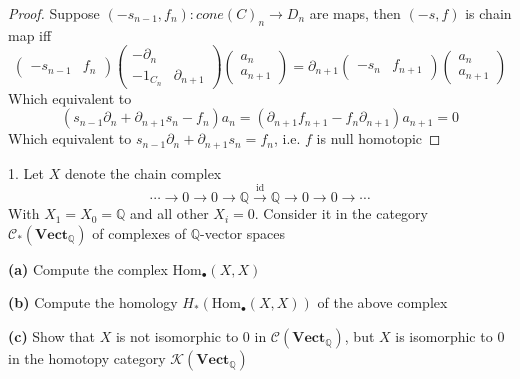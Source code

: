 \documentclass[../main.tex]{subfiles}
\begin{document}
\begin{proof}
Suppose $(-s_{n-1},f_n):cone(C)_n\to D_n$ are maps, then $(-s,f)$ is chain map iff
\[\begin{pmatrix}
-s_{n-1} & f_n
\end{pmatrix}\begin{pmatrix}
-\partial_n & \\
-1_{C_n} & \partial_{n+1}
\end{pmatrix}\begin{pmatrix}
a_n \\
a_{n+1}
\end{pmatrix}=\partial_{n+1}\begin{pmatrix}
-s_n & f_{n+1}
\end{pmatrix}\begin{pmatrix}
a_n \\
a_{n+1}
\end{pmatrix}\]
Which equivalent to
\[(s_{n-1}\partial_n+\partial_{n+1}s_n-f_n)a_n=(\partial_{n+1}f_{n+1}-f_n\partial_{n+1})a_{n+1}=0\]
Which equivalent to $s_{n-1}\partial_n+\partial_{n+1}s_n=f_n$, i.e. $f$ is null homotopic
\end{proof}

\begin{customexercise}{1.}
Let $X$ denote the chain complex
\[\cdots\to0\to0\to\mathbb Q\xrightarrow{\mathrm{id}}\mathbb Q\to0\to0\to\cdots\]
With $X_1=X_0=\mathbb Q$ and all other $X_i=0$. Consider it in the category $\mathscr C_*(\mathbf{Vect}_\mathbb{Q})$ of complexes of $\mathbb Q$-vector spaces \par
\textbf{(a) }Compute the complex $\mathrm{Hom}_\bullet(X,X)$ \par
\textbf{(b) }Compute the homology $H_*(\mathrm{Hom}_\bullet(X,X))$ of the above complex \par
\textbf{(c) }Show that $X$ is not isomorphic to $0$ in $\mathscr C(\mathbf{Vect}_\mathbb{Q})$, but $X$ is isomorphic to $0$ in the homotopy category $\mathscr K(\mathbf{Vect}_\mathbb{Q})$
\end{customexercise}
\end{document}
